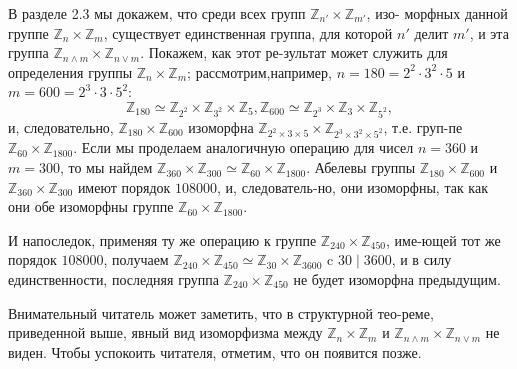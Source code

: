 \documentclass{mai_book}
\begin{document}
  В разделе 2.3 мы докажем, что среди всех групп $\mathbb{Z}_{n'} \times \mathbb{Z}_{m'}$, изо- \linebreak морфных данной группе $\mathbb{Z}_{n} \times \mathbb{Z}_{m}$, существует единственная группа, для \linebreak которой $n'$ делит $m'$, и эта группа $\mathbb{Z}_{n \wedge m} \times \mathbb{Z}_{n \vee m}$. Покажем, как этот ре-\linebreak зультат может служить для определения группы  $\mathbb{Z}_{n} \times \mathbb{Z}_{m}$; рассмотрим,\linebreak например, $n=180=2^2 \cdot 3^2 \cdot 5$ и $m=600=2^3 \cdot 3 \cdot 5^2$:
$$\mathbb{Z}_{180} \simeq \mathbb{Z}_{2^2} \times \mathbb{Z}_{3^2} \times \mathbb{Z}_{5}, \mathbb{Z}_{600} \simeq \mathbb{Z}_{2^3} \times \mathbb{Z}_{3} \times \mathbb{Z}_{5^2},$$
и, следовательно, $\mathbb{Z}_{180} \times \mathbb{Z}_{600}$ изоморфна $\mathbb{Z}_{2^2 \times 3 \times 5} \times \mathbb{Z}_{2^3 \times 3^2 \times 5^2}$, т.е. груп-\linebreak пе $\mathbb{Z}_{60}\times \mathbb{Z}_{1800}$. Если мы проделаем аналогичную операцию для чисел \linebreak $n = 360$ и $m = 300$, то мы найдем $\mathbb{Z}_{360} \times \mathbb{Z}_{300} \simeq \mathbb{Z}_{60} \times \mathbb{Z}_{1800}$. Абелевы \linebreak группы $\mathbb{Z}_{180} \times \mathbb{Z}_{600}$ и $\mathbb{Z}_{360}\times \mathbb{Z}_{300}$ имеют порядок $108000$, и, следователь-\linebreak но, они изоморфны, так как они обе изоморфны группе $\mathbb{Z}_{60} \times \mathbb{Z}_{1800}$.
  
  И напоследок, применяя ту же операцию к группе $\mathbb{Z}_{240} \times \mathbb{Z}_{450}$, име-\linebreak ющей тот же порядок $108000$, получаем $\mathbb{Z}_{240} \times \mathbb{Z}_{450} \simeq \mathbb{Z}_{30} \times \mathbb{Z}_{3600}$ c \linebreak $30 \mid 3600$, и в силу единственности, последняя группа $\mathbb{Z}_{240} \times \mathbb{Z}_{450}$ не \linebreak будет изоморфна предыдущим.
  
  Внимательный читатель может заметить, что в структурной тео-\linebreak реме, приведенной выше, явный вид изоморфизма между $\mathbb{Z}_{n}\times \mathbb{Z}_{m}$ и \linebreak $\mathbb{Z}_{n \wedge m} \times \mathbb{Z}_{n \vee m}$ не виден. Чтобы успокоить читателя, отметим, что он \linebreak появится позже. \newpage
\end{document}
